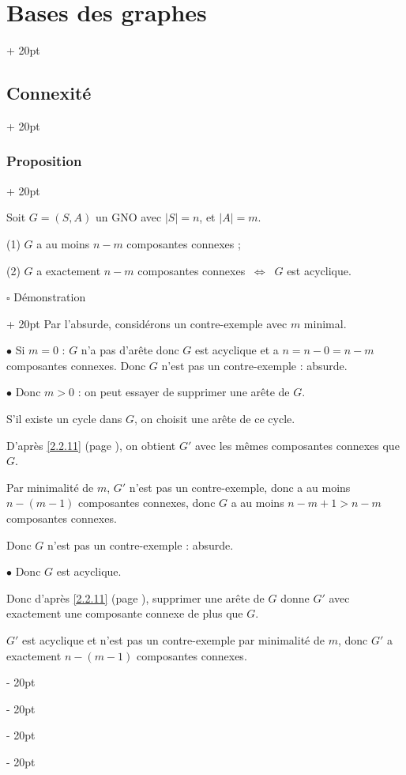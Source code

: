 \documentclass[a4paper, 12pt, twoside]{article}
\newcommand{\abs}[1]{\left\lvert #1 \right\rvert}
\newcommand{\ssi}{\ \Leftrightarrow \ }
\newcommand{\ind}[1][20pt]{\advance\leftskip + #1}
\newcommand{\deind}[1][20pt]{\advance\leftskip - #1}
\newenvironment{indt}[2][20pt]{#2 \par \ind[#1]}{\par \deind} %
\begin{document}
\begin{indt}{\section{Bases des graphes}}
\begin{indt}{\subsection{Connexité}}
            \vspace{12pt}
            
            \begin{indt}{\subsubsection{Proposition}}
                \label{2.2.12}

                Soit $G = (S, A)$ un GNO avec $\abs S = n$, et $\abs A = m$.

                (1) $G$ a au moins $n - m$ composantes connexes ;

                (2) $G$ a exactement $n - m$ composantes connexes $\ssi$ $G$ est acyclique.

                \vspace{12pt}
                
                \begin{indt}{$\square$ Démonstration}
                    Par l'absurde, considérons un contre-exemple avec $m$ minimal.

                    $\bullet$ Si $m = 0$ : $G$ n'a pas d'arête donc $G$ est acyclique et a $n = n - 0 = n - m$ composantes connexes.
                    Donc $G$ n'est pas un contre-exemple : absurde.

                    $\bullet$ Donc $m > 0$ : on peut essayer de supprimer une arête de $G$.

                    S'il existe un cycle dans $G$, on choisit une arête de ce cycle.

                    D'après \ref{2.2.11} (page \pageref{2.2.11}), on obtient $G'$ avec les mêmes composantes connexes que $G$.

                    Par minimalité de $m$, $G'$ n'est pas un contre-exemple, donc a au moins $n - (m - 1)$ composantes connexes, donc $G$ a au moins $n - m + 1 > n - m$ composantes connexes.

                    Donc $G$ n'est pas un contre-exemple : absurde.

                    $\bullet$ Donc $G$ est acyclique.

                    Donc d'après \ref{2.2.11} (page \pageref{2.2.11}), supprimer une arête de $G$ donne $G'$ avec exactement une composante connexe de plus que $G$.

                    $G'$ est acyclique et n'est pas un contre-exemple par minimalité de $m$, donc $G'$ a exactement $n - (m - 1)$ composantes connexes.


\end{indt}
\end{indt}
\end{indt}
\end{indt}
\end{document}
